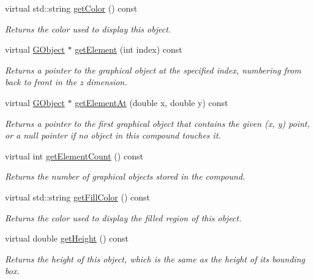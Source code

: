 \begin{DoxyCompactItemize}
virtual std\+::string \mbox{\hyperlink{classGObject_aa061dfa488c31e18549d64363c1d0e34}{get\+Color}} () const
\begin{DoxyCompactList}\small\item\em Returns the color used to display this object. \end{DoxyCompactList}\item 
virtual \mbox{\hyperlink{classGObject}{G\+Object}} $\ast$ \mbox{\hyperlink{classGCompound_abde388cc529d22bb5f7f4a54d56049d8}{get\+Element}} (int index) const
\begin{DoxyCompactList}\small\item\em Returns a pointer to the graphical object at the specified index, numbering from back to front in the {\itshape z} dimension. \end{DoxyCompactList}\item 
virtual \mbox{\hyperlink{classGObject}{G\+Object}} $\ast$ \mbox{\hyperlink{classGCompound_a25efa999eca5790ec26ef091b05f961c}{get\+Element\+At}} (double x, double y) const
\begin{DoxyCompactList}\small\item\em Returns a pointer to the first graphical object that contains the given (x, y) point, or a null pointer if no object in this compound touches it. \end{DoxyCompactList}\item 
virtual int \mbox{\hyperlink{classGCompound_adf7d37ec315f859648def92e6b32408f}{get\+Element\+Count}} () const
\begin{DoxyCompactList}\small\item\em Returns the number of graphical objects stored in the compound. \end{DoxyCompactList}\item 
virtual std\+::string \mbox{\hyperlink{classGObject_a76f6964a11fde7c78e9751be184e1a3c}{get\+Fill\+Color}} () const
\begin{DoxyCompactList}\small\item\em Returns the color used to display the filled region of this object. \end{DoxyCompactList}\item 
virtual double \mbox{\hyperlink{classGObject_a1e7e353362434072875264cf95629f99}{get\+Height}} () const
\begin{DoxyCompactList}\small\item\em Returns the height of this object, which is the same as the height of its bounding box. \end{DoxyCompactList}\item 

\end{DoxyCompactItemize}
